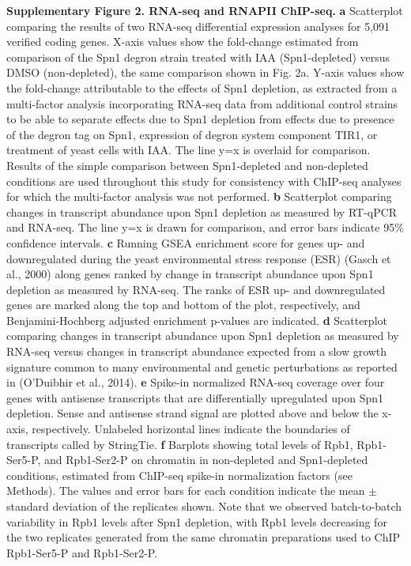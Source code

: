 \documentclass[8pt]{extarticle}
\begin{document}
\textbf{Supplementary Figure 2. RNA-seq and RNAPII ChIP-seq.}
\textbf{a} Scatterplot comparing the results of two RNA-seq differential expression analyses for 5,091 verified coding genes.
X-axis values show the fold-change estimated from comparison of the Spn1 degron strain treated with IAA (Spn1-depleted) versus DMSO (non-depleted), the same comparison shown in Fig. 2a.
Y-axis values show the fold-change attributable to the effects of Spn1 depletion, as extracted from a multi-factor analysis incorporating RNA-seq data from additional control strains to be able to separate effects due to Spn1 depletion from effects due to presence of the degron tag on Spn1, expression of degron system component TIR1, or treatment of yeast cells with IAA.
The line y=x is overlaid for comparison.
Results of the simple comparison between Spn1-depleted and non-depleted conditions are used throughout this study for consistency with ChIP-seq analyses for which the multi-factor analysis was not performed.
\textbf{b} Scatterplot comparing changes in transcript abundance upon Spn1 depletion as measured by RT-qPCR and RNA-seq. The line y=x is drawn for comparison, and error bars indicate 95\% confidence intervals.
\textbf{c} Running GSEA enrichment score for genes up- and downregulated during the yeast environmental stress response (ESR) (Gasch et al., 2000) along genes ranked by change in transcript abundance upon Spn1 depletion as measured by RNA-seq.
The ranks of ESR up- and downregulated genes are marked along the top and bottom of the plot, respectively, and Benjamini-Hochberg adjusted enrichment p-values are indicated.
\textbf{d} Scatterplot comparing changes in transcript abundance upon Spn1 depletion as measured by RNA-seq versus changes in transcript abundance expected from a slow growth signature common to many environmental and genetic perturbations as reported in (O'Duibhir et al., 2014). 
\textbf{e} Spike-in normalized RNA-seq coverage over four genes with antisense transcripts that are differentially upregulated upon Spn1 depletion.
Sense and antisense strand signal are plotted above and below the x-axis, respectively.
Unlabeled horizontal lines indicate the boundaries of transcripts called by StringTie.
\textbf{f} Barplots showing total levels of Rpb1, Rpb1-Ser5-P, and Rpb1-Ser2-P on chromatin in non-depleted and Spn1-depleted conditions, estimated from ChIP-seq spike-in normalization factors (see Methods).
The values and error bars for each condition indicate the mean $\pm$ standard deviation of the replicates shown.
Note that we observed batch-to-batch variability in Rpb1 levels after Spn1 depletion, with Rpb1 levels decreasing for the two replicates generated from the same chromatin preparations used to ChIP Rpb1-Ser5-P and Rpb1-Ser2-P.
\end{document}
